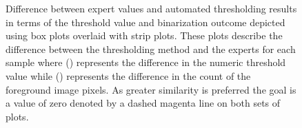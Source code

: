 \begin{figure}
    \centering
    
    \caption[Difference between expert values and automated thresholding results in terms of the threshold value and binarization outcome]{Difference between expert values and automated thresholding results in terms of the threshold value and binarization outcome depicted using box plots overlaid with strip plots. These plots describe the difference between the thresholding method and the experts for each sample where () represents the difference in the numeric threshold value while () represents the difference in the count of the foreground image pixels. As greater similarity is preferred the goal is a value of zero denoted by a dashed magenta line on both sets of plots.}
    \label{fig:expert_boxplot}
\end{figure}
